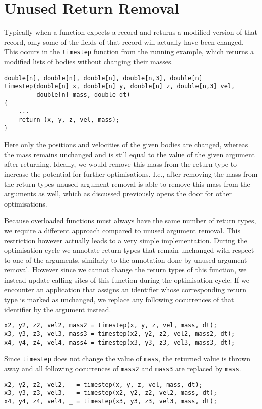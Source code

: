 
\section{Unused Return Removal}

Typically when a function expects a record and returns a modified version of that record, only some of the fields of that record will actually have been changed.
This occurs in the \texttt{timestep} function from the running example, which returns a modified lists of bodies without changing their masses.
%
\begin{lstlisting}
double[n], double[n], double[n], double[n,3], double[n]
timestep(double[n] x, double[n] y, double[n] z, double[n,3] vel,
         double[n] mass, double dt)
{
    ...
    return (x, y, z, vel, mass);
}
\end{lstlisting}
%
Here only the positions and velocities of the given bodies are changed, whereas the mass remains unchanged and is still equal to the value of the given argument after returning.
Ideally, we would remove this mass from the return type to increase the potential for further optimisations.
I.e., after removing the mass from the return types unused argument removal is able to remove this mass from the arguments as well, which as discussed previously opens the door for other optimisations.

Because overloaded functions must always have the same number of return types, we require a different approach compared to unused argument removal.
This restriction however actually leads to a very simple implementation.
During the optimisation cycle we annotate return types that remain unchanged with respect to one of the arguments, similarly to the annotation done by unused argument removal.
However since we cannot change the return types of this function, we instead update calling sites of this function during the optimisation cycle.
If we encounter an application that assigns an identifier whose corresponding return type is marked as unchanged, we replace any following occurrences of that identifier by the argument instead.
%
\begin{lstlisting}
x2, y2, z2, vel2, mass2 = timestep(x, y, z, vel, mass, dt);
x3, y3, z3, vel3, mass3 = timestep(x2, y2, z2, vel2, mass2, dt);
x4, y4, z4, vel4, mass4 = timestep(x3, y3, z3, vel3, mass3, dt);
\end{lstlisting}
%
Since \texttt{timestep} does not change the value of \texttt{mass}, the returned value is thrown away and all following occurrences of \texttt{mass2} and \texttt{mass3} are replaced by \texttt{mass}.
%
\begin{lstlisting}
x2, y2, z2, vel2, _ = timestep(x, y, z, vel, mass, dt);
x3, y3, z3, vel3, _ = timestep(x2, y2, z2, vel2, mass, dt);
x4, y4, z4, vel4, _ = timestep(x3, y3, z3, vel3, mass, dt);
\end{lstlisting}
